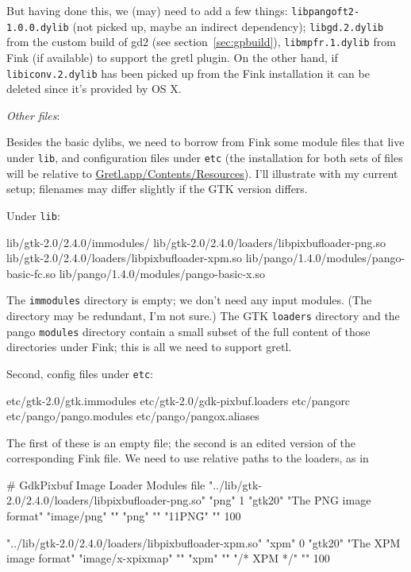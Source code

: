 \documentclass{article}
\begin{document}
But having done this, we (may) need to add a few things:
\texttt{libpangoft2-1.0.0.dylib} (not picked up, maybe an indirect
dependency); \texttt{libgd.2.dylib} from the custom build of gd2 (see
section~\ref{sec:gpbuild}), \texttt{libmpfr.1.dylib} from Fink (if
available) to support the gretl plugin.  On the other hand, if
\texttt{libiconv.2.dylib} has been picked up from the Fink
installation it can be deleted since it's provided by OS X.

\textit{Other files}: 

Besides the basic dylibs, we need to borrow from Fink some module
files that live under \texttt{lib}, and configuration files under
\texttt{etc} (the installation for both sets of files will be relative
to \url{Gretl.app/Contents/Resources}).  I'll illustrate with my
current setup; filenames may differ slightly if the GTK version
differs.

Under \texttt{lib}:

\begin{code}
lib/gtk-2.0/2.4.0/immodules/
lib/gtk-2.0/2.4.0/loaders/libpixbufloader-png.so
lib/gtk-2.0/2.4.0/loaders/libpixbufloader-xpm.so
lib/pango/1.4.0/modules/pango-basic-fc.so  
lib/pango/1.4.0/modules/pango-basic-x.so
\end{code}

The \texttt{immodules} directory is empty; we don't need any input
modules.  (The directory may be redundant, I'm not sure.)  The GTK
\texttt{loaders} directory and the pango \texttt{modules} directory
contain a small subset of the full content of those directories under
Fink; this is all we need to support gretl. 

Second, config files under \texttt{etc}:

\begin{code}
etc/gtk-2.0/gtk.immodules
etc/gtk-2.0/gdk-pixbuf.loaders
etc/pangorc
etc/pango/pango.modules
etc/pango/pangox.aliases
\end{code}

The first of these is an empty file; the second is an edited
version of the corresponding Fink file.  We need to use relative
paths to the loaders, as in

\begin{code}
# GdkPixbuf Image Loader Modules file
"../lib/gtk-2.0/2.4.0/loaders/libpixbufloader-png.so"
"png" 1 "gtk20" "The PNG image format"
"image/png" ""
"png" ""
"\211PNG\r\n{}\n" "" 100

"../lib/gtk-2.0/2.4.0/loaders/libpixbufloader-xpm.so"
"xpm" 0 "gtk20" "The XPM image format"
"image/x-xpixmap" ""
"xpm" ""
"/* XPM */" "" 100
\end{code}
\end{document}
